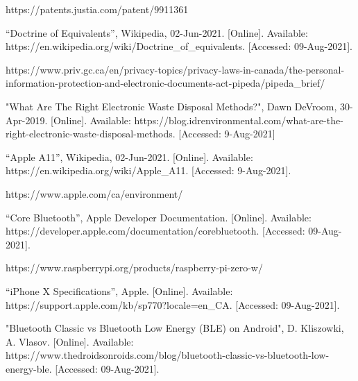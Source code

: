 \documentclass[a4paper,11pt]{article}
\begin{document}
\begin{thebibliography}{9}
https://patents.justia.com/patent/9911361

“Doctrine of Equivalents”, Wikipedia, 02-Jun-2021. [Online]. Available: https://en.wikipedia.org/wiki/Doctrine\_of\_equivalents. [Accessed: 09-Aug-2021].

https://www.priv.gc.ca/en/privacy-topics/privacy-laws-in-canada/the-personal-information-protection-and-electronic-documents-act-pipeda/pipeda\_brief/

"What Are The Right Electronic Waste Disposal Methods?", Dawn DeVroom, 30-Apr-2019. [Online]. Available: https://blog.idrenvironmental.com/what-are-the-right-electronic-waste-disposal-methods. [Accessed: 9-Aug-2021]

“Apple A11”, Wikipedia, 02-Jun-2021. [Online]. Available:
https://en.wikipedia.org/wiki/Apple\_A11. [Accessed: 9-Aug-2021].

https://www.apple.com/ca/environment/

“Core Bluetooth”, Apple Developer Documentation. [Online]. Available: https://developer.apple.com/documentation/corebluetooth. [Accessed: 09-Aug-2021]. 

https://www.raspberrypi.org/products/raspberry-pi-zero-w/

“iPhone X Specifications”, Apple. [Online]. Available: https://support.apple.com/kb/sp770?locale=en\_CA. [Accessed: 09-Aug-2021]. 

"Bluetooth Classic vs Bluetooth Low Energy (BLE) on Android", D. Kliszowki, A. Vlasov. [Online]. Available: https://www.thedroidsonroids.com/blog/bluetooth-classic-vs-bluetooth-low-energy-ble. [Accessed: 09-Aug-2021].


\end{thebibliography}
\end{document}
